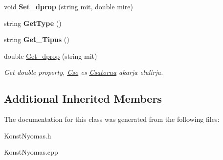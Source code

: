 \begin{DoxyCompactItemize}
\mbox{\label{class_konst_nyomas_aebe3ac3a8be035145dbc56429c8d2831}} 
void {\bfseries Set\+\_\+dprop} (string mit, double mire)
\item 
\mbox{\label{class_konst_nyomas_ac142568860665970fab5de0921758f2e}} 
string {\bfseries Get\+Type} ()
\item 
\mbox{\label{class_konst_nyomas_ad0195a57039e63d89b2507cb9f3796af}} 
string {\bfseries Get\+\_\+\+Tipus} ()
\item 
\mbox{\label{class_konst_nyomas_ab32bc8a74893a32b5db7d8fc3a4a999e}} 
double \hyperlink{class_konst_nyomas_ab32bc8a74893a32b5db7d8fc3a4a999e}{Get\+\_\+dprop} (string mit)
\begin{DoxyCompactList}\small\item\em Get double property, \hyperlink{class_cso}{Cso} es \hyperlink{class_csatorna}{Csatorna} akarja elulirja. \end{DoxyCompactList}\end{DoxyCompactItemize}
\subsection*{Additional Inherited Members}


The documentation for this class was generated from the following files\+:\begin{DoxyCompactItemize}
\item 
Konst\+Nyomas.\+h\item 
Konst\+Nyomas.\+cpp\end{DoxyCompactItemize}
